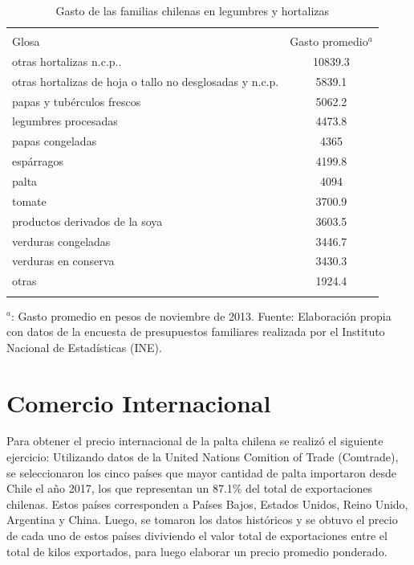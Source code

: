 \begin{table}[!htbp] \centering 
	\begin{threeparttable}
		\caption{Gasto de las familias chilenas en legumbres y hortalizas} 
		\label{gasto_palta} 
		\begin{tabular}{@{\extracolsep{5pt}}lc} 
					\\[-1.8ex]\hline 
					\hline \\[-1.8ex] 
					Glosa & Gasto promedio$^{a}$ \\ \hline 
otras hortalizas n.c.p.. & 10839.3 \\                               
otras hortalizas de hoja o tallo no desglosadas y n.c.p. & 5839.1 \\
papas y tubérculos frescos & 5062.2 \\                              
legumbres procesadas & 4473.8 \\                                    
papas congeladas & 4365 \\                                          
espárragos & 4199.8 \\                                              
palta & 4094 \\                                                    
tomate & 3700.9 \\                                                  
productos derivados de la soya & 3603.5 \\                         
verduras congeladas & 3446.7 \\                                    
verduras en conserva & 3430.3 \\                                  
otras & 1924.4 \\     
\hline 
\hline \\[-1.8ex]                                             
	\end{tabular} 
	\begin{tablenotes}
		\small 
		\item $^{a}$: Gasto promedio en pesos de noviembre de 2013. Fuente: Elaboración propia con datos de la encuesta de presupuestos familiares realizada por el Instituto Nacional de Estadísticas (INE). 
	\end{tablenotes}
\end{threeparttable}
\end{table}  

\section{Comercio Internacional}

Para obtener el precio internacional de la palta chilena se realizó el siguiente ejercicio: Utilizando datos de la United Nations Comition of Trade (Comtrade), se seleccionaron los cinco países que mayor cantidad de palta importaron desde Chile el año 2017, los que representan un 87.1\% del total de exportaciones chilenas. Estos países corresponden a Países Bajos, Estados Unidos, Reino Unido, Argentina y China. Luego, se tomaron los datos históricos y se obtuvo el precio de cada uno de estos países diviviendo el valor total de exportaciones entre el total de kilos exportados, para luego elaborar un precio promedio ponderado. 